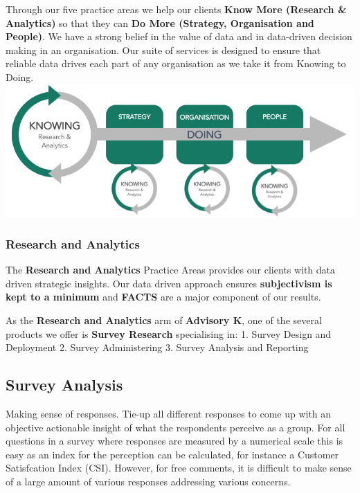 \documentclass[11pt]{article}
\makeatletter
\def\maxwidth{\ifdim\Gin@nat@width>\linewidth\linewidth
    \else\Gin@nat@width\fi}
\let\Oldincludegraphics\includegraphics
\renewcommand{\includegraphics}[1]{\Oldincludegraphics[width=.8\maxwidth]{#1}}
\makeatother
\begin{document}
Through our five practice areas we help our clients \textbf{Know More
(Research \& Analytics)} so that they can \textbf{Do More (Strategy,
Organisation and People)}. We have a strong belief in the value of data
and in data-driven decision making in an organisation. Our suite of
services is designed to ensure that reliable data drives each part of
any organisation as we take it from Knowing to Doing.\\
\includegraphics{PIcture1.png}

\subsubsection{Research and Analytics}\label{research-and-analytics}

The \textbf{Research and Analytics} Practice Areas provides our clients
with data driven strategic insights. Our data driven approach ensures
\textbf{subjectivism is kept to a minimum} and \textbf{FACTS} are a
major component of our results.

As the \textbf{Research and Analytics} arm of \textbf{Advisory K}, one
of the several products we offer is \textbf{Survey Research}
specialising in: 1. Survey Design and Deployment 2. Survey Administering
3. Survey Analysis and Reporting

\subsection{Survey Analysis}\label{survey-analysis}

Making sense of responses. Tie-up all different responses to come up
with an objective actionable insight of what the respondents perceive as
a group. For all questions in a survey where responses are measured by a
numerical scale this is easy as an index for the perception can be
calculated, for instance a Customer Satisfcation Index (CSI). However,
for free comments, it is difficult to make sense of a large amount of
various responses addressing various concerns.
\end{document}
